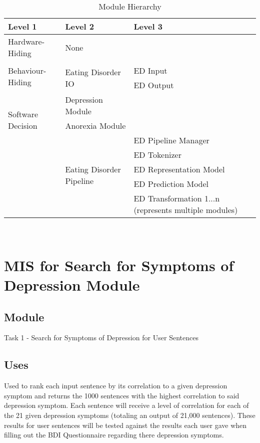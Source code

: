 \documentclass[12pt, titlepage]{article}
\begin{document}
\begin{table}[h!]
\centering
\begin{tabular}{p{} p{} p{}}
\toprule
\textbf{Level 1} & \textbf{Level 2} & \textbf{Level 3}\\
\midrule

{Hardware-Hiding} & None \\
\midrule

\multirow{3}{*}{Behaviour-Hiding} & \\ \cline{2-3}
& \multirow{2}{*}{Eating Disorder IO} & ED Input\\
& & ED Output\\
\midrule

\multirow{3}{*}{Software Decision} 
& Depression Module\\
& Anorexia Module\\ \cline{2-3}
& \multirow{5}{*}{Eating Disorder Pipeline} & ED Pipeline Manager\\
& & ED Tokenizer\\
& & ED Representation Model\\
& & ED Prediction Model\\
& & ED Transformation 1...n (represents multiple modules)\\
\bottomrule

\end{tabular}
\caption{Module Hierarchy}
\label{TblMH}
\end{table}

\newpage
~\newpage

\section{MIS for Search for Symptoms of Depression Module} \label{Module} 

\subsection{Module}

Task 1 - Search for Symptoms of Depression for User Sentences 


\subsection{Uses}

Used to rank each input sentence by its correlation to a given depression symptom and returns the 1000 sentences with the highest correlation to said depression symptom. Each sentence will receive a level of correlation for each of the 21 given depression symptoms (totaling an output of 21,000 sentences). These results for user sentences will be tested against the results each user gave when filling out the BDI Questionnaire regarding there depression symptoms.
\end{document}
